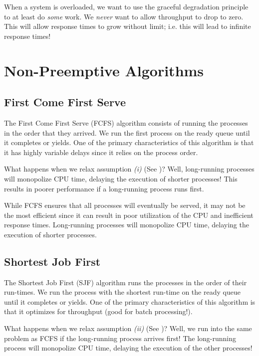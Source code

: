 \documentclass{report}
\newcommand{\bookBegin}[1]{\begin{tcolorbox}[colback=black!5!white,colframe=black!75!black,title={\textit{Operating Systems, Three Easy Pieces: #1}}]}
\newcommand{\bookEnd}{\end{tcolorbox}}
\begin{document}
When a system is overloaded, we want to use the graceful degradation principle to at least do
\textit{some} work. We \textit{never} want to allow throughput to drop to zero. This will allow
response times to grow without limit; i.e. this will lead to infinite response times!


\section{Non-Preemptive Algorithms}


\subsection{First Come First Serve}
The First Come First Serve (FCFS) algorithm consists of running the processes in the order that they
arrived. We run the first process on the ready queue until it completes or yields. One of the
primary characteristics of this algorithm is that it has highly variable delays since it relies on
the process order.

\bookBegin{FIFO/FCFS}
What happens when we relax assumption \textit{(i)} (See \textbf{})? Well,
long-running processes will monopolize CPU time, delaying the execution of shorter processes! This
results in poorer performance if a long-running process runs first.
\bookEnd

While FCFS ensures that all processes will eventually be served, it may not be the most efficient
since it can result in poor utilization of the CPU and inefficient response times. Long-running
processes will monopolize CPU time, delaying the execution of shorter processes.


\subsection{Shortest Job First}
The Shortest Job First (SJF) algorithm runs the processes in the order of their run-times. We run
the process with the shortest run-time on the ready queue until it completes or yields. One of the
primary characteristics of this algorithm is that it optimizes for throughput (good for batch
processing!).

\bookBegin{FIFO/FCFS}
What happens when we relax assumption \textit{(ii)} (See \textbf{})? Well, we
run into the same problem as FCFS if the long-running process arrives first! The long-running
process will monopolize CPU time, delaying the execution of the other processes! 
\bookEnd
\end{document}
